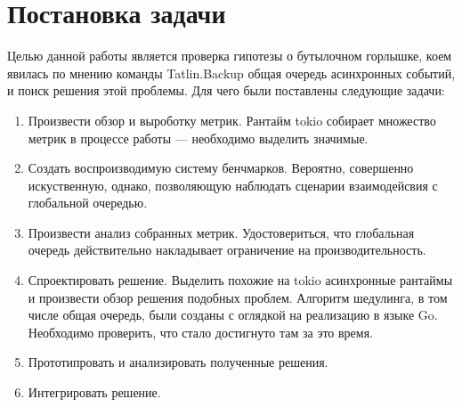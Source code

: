 
\section{Постановка задачи}
\label{sec:task}

Целью данной работы является проверка гипотезы о бутылочном горлышке, коем явилась по мнению команды Tatlin.Backup общая очередь асинхронных событий, и поиск решения этой проблемы. Для чего были поставлены следующие задачи:

\begin{enumerate}
    \item Произвести обзор и выроботку метрик. Рантайм tokio собирает множество метрик в процессе работы --- необходимо выделить значимые.
    \item Создать воспроизводимую систему бенчмарков. Вероятно, совершенно искуственную, однако, позволяющую наблюдать сценарии взаимодейсвия с глобальной очередью.
    \item Произвести анализ собранных метрик. Удостовериться, что глобальная очередь действительно накладывает ограничение на производительность.
    \item Спроектировать решение. Выделить похожие на tokio асинхронные рантаймы и произвести обзор решения подобных проблем. Алгоритм шедулинга, в том числе общая очередь, были созданы с оглядкой на реализацию в языке Go. Необходимо проверить, что стало достигнуто там за это время.
    \item Прототипровать и анализировать полученные решения.
    \item Интегрировать решение.
\end{enumerate}
